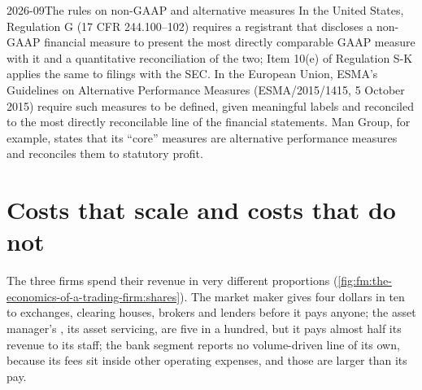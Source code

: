 \begin{dated}{2026-09}{The rules on non-GAAP and alternative measures}\label{dat:fm:the-economics-of-a-trading-firm:rules}
In the United States, Regulation G (17 CFR 244.100--102) requires a registrant that discloses a non-GAAP financial measure to present the most
directly comparable GAAP measure with it and a quantitative reconciliation of the two; Item 10(e) of Regulation S-K applies the same to filings with
the SEC. In the European Union, ESMA's Guidelines on Alternative Performance Measures (ESMA/2015/1415, 5 October 2015) require such measures to be
defined, given meaningful labels and reconciled to the most directly reconcilable line of the financial statements. Man Group, for example, states
that its ``core'' measures are alternative performance measures and reconciles them to statutory profit.
\end{dated}

\section{Costs that scale and costs that do not}

The three firms spend their revenue in very different proportions (\cref{fig:fm:the-economics-of-a-trading-firm:shares}). The market maker gives
four dollars in ten to exchanges, clearing houses, brokers and lenders before it pays anyone; the asset manager's , its asset
servicing, are five in a hundred, but it pays almost half its revenue to its staff; the bank segment reports no volume-driven line of its own,
because its fees sit inside other operating expenses, and those are larger than its pay.

